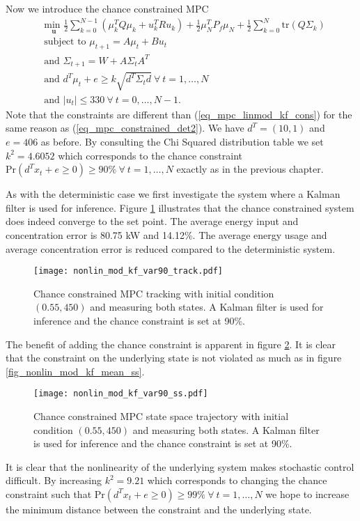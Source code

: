 Now we introduce the chance constrained MPC
\begin{equation}
\begin{aligned}
&\underset{\mathbf{u}}{\text{min }} \frac{1}{2}\sum_{k=0}^{N-1} \left( \mu_k^TQ\mu_k + u_k^TRu_k \right) + \frac{1}{2}\mu_N^TP_f\mu_N + \frac{1}{2}\sum_{k=0}^N \text{tr}(Q\Sigma_k) \\
& \text{subject to } \mu_{t+1}=A\mu_t + Bu_t \\
& \text{and } \Sigma_{t+1} = W+A\Sigma_t A^T \\
& \text{and } d^T\mu_t + e \geq k\sqrt{d^T \Sigma_t d} ~\forall ~t=1,\hdots,N\\
& \text{and } |u_t| \leq 330 ~\forall ~t=0,\hdots,N-1.
\end{aligned}
\label{eq_mpc_nonlin_mod_cons}
\end{equation}
Note that the constraints are different than (\ref{eq_mpc_linmod_kf_cons}) for the same reason as (\ref{eq_mpc_constrained_det2}). We have $d^T = (10, 1)$ and $e=406$ as before. By consulting the Chi Squared distribution table we set $k^2 = 4.6052$ which corresponds to the chance constraint $\text{Pr}(d^Tx_t + e \geq 0) \geq 90\% ~\forall ~t=1,\hdots,N$ exactly as in the previous chapter.

As with the deterministic case we first investigate the system where a Kalman filter is used for inference. Figure \ref{fig_nonlin_mod_kf_var90_track} illustrates that the chance constrained system does indeed converge to the set point. The average energy input and concentration error is 80.75 kW and 14.12\%. The average energy usage and average concentration error is reduced compared to the deterministic system. 
\begin{figure}[H] 
\centering
\texttt{[image: nonlin\_mod\_kf\_var90\_track.pdf]}
\caption{Chance constrained MPC tracking with initial condition $(0.55, 450)$ and measuring both states. A Kalman filter is used for inference and the chance constraint is set at 90\%.}
\label{fig_nonlin_mod_kf_var90_track}
\end{figure}
The benefit of adding the chance constraint is apparent in figure \ref{fig_nonlin_mod_kf_var90_ss}. It is clear that the constraint on the underlying state is not violated as much as in figure \ref{fig_nonlin_mod_kf_mean_ss}. 
\begin{figure}[H] 
\centering
\texttt{[image: nonlin\_mod\_kf\_var90\_ss.pdf]}
\caption{Chance constrained MPC state space trajectory with initial condition $(0.55, 450)$ and measuring both states. A Kalman filter is used for inference and the chance constraint is set at 90\%.}
\label{fig_nonlin_mod_kf_var90_ss}
\end{figure}
It is clear that the nonlinearity of the underlying system makes stochastic control difficult. By increasing $k^2=9.21$ which corresponds to changing the chance constraint such that $\text{Pr}(d^Tx_t + e \geq 0) \geq 99\% ~\forall ~t=1,\hdots,N$ we hope to increase the minimum distance between the constraint and the underlying state.

